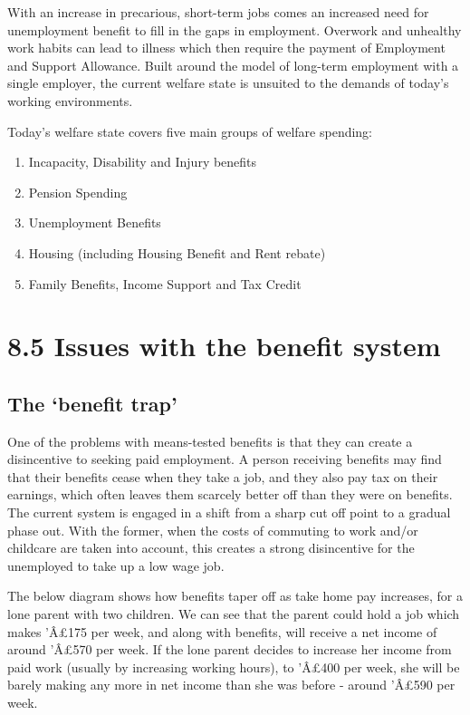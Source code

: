 \documentclass[]{tufte-handout}
\providecommand{\tightlist}{%
  \setlength{\itemsep}{0pt}\setlength{\parskip}{0pt}}
\begin{document}
With an increase in precarious, short-term jobs comes an increased need
for unemployment benefit to fill in the gaps in employment. Overwork and
unhealthy work habits can lead to illness which then require the payment
of Employment and Support Allowance. Built around the model of long-term
employment with a single employer, the current welfare state is unsuited
to the demands of today's working environments.

Today's welfare state covers five main groups of welfare spending:

\begin{enumerate}
\def\labelenumi{\arabic{enumi}.}
\tightlist
\item
  Incapacity, Disability and Injury benefits
\item
  Pension Spending
\item
  Unemployment Benefits
\item
  Housing (including Housing Benefit and Rent rebate)
\item
  Family Benefits, Income Support and Tax Credit
\end{enumerate}

\hypertarget{issues-with-the-benefit-system}{%
\section{8.5 Issues with the benefit
system}\label{issues-with-the-benefit-system}}

\hypertarget{the-benefit-trap}{%
\subsection{The `benefit trap'}\label{the-benefit-trap}}

One of the problems with means-tested benefits is that they can create a
disincentive to seeking paid employment. A person receiving benefits may
find that their benefits cease when they take a job, and they also pay
tax on their earnings, which often leaves them scarcely better off than
they were on benefits. The current system is engaged in a shift from a
sharp cut off point to a gradual phase out. With the former, when the
costs of commuting to work and/or childcare are taken into account, this
creates a strong disincentive for the unemployed to take up a low wage
job.

The below diagram shows how benefits taper off as take home pay
increases, for a lone parent with two children. We can see that the
parent could hold a job which makes 'Â£175 per week, and along with
benefits, will receive a net income of around 'Â£570 per week. If the
lone parent decides to increase her income from paid work (usually by
increasing working hours), to 'Â£400 per week, she will be barely making
any more in net income than she was before - around 'Â£590 per week.
\end{document}

